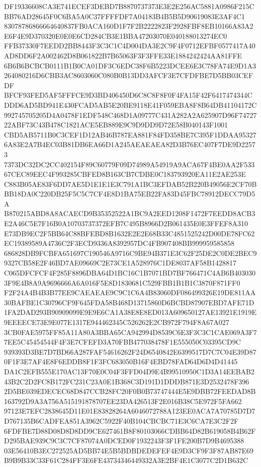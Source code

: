 \documentclass[UTF8,fontset=fandol,zihao=-4,a4paper]{ctexart}
\begin{document}
{{DF19336608CA3E741ECEF3DEBD7B8870737373E3E2E256AC5881A0986F215CBB76AD28645F0C6BA5A0C37FFFFDF7A04183B4B5B5D90619083E3AF4C1
83078786866664640837FB0ACA160D1F7F2B2222823F2928FBF8EB10166A83A2E6F4E9D370320E0E0E6CD284CB3E1BBA47203070E040188013274EC0
FFB37330F7EEDD2BB8443F3C3C1C4D004DA3E2C9F4F0712EFBF0577417A40AD8DD6F2A002462D8B061822B7B65063F3F3FFE33E1884242424AA81FFE
6B6B6BCBCB0111B1B0CA01DF3C6EDC38F6B5223DCEE6E3C78FA74E9D1A3264080216D6CBB3AC8603060C080B0B13DD3AFCF3E7CFDFBE7D5BB03CEFDF
BFCF93FED5AF5FFFCE9D3BD406450D6C8C8F8F0F4FA15F42F6417474344CDDD6AD5BD941E430FCAD5AB5E20BE9118E41F059EBA8F8B64DB41104172C
992745705205D4A0478F1EDF548C468D1A09777C431A282A2A625907D96F7472722ABF73C43B478C1821ACE5EB889E9C9D9DD9D72E58B040143F1001
CBD5AB5711B0C3CEF1D12AB46B787EA881F84FD358BE7C395F1DDAA953276A83E2A7B4EC03B81DB6EA66D1A245AEAEAEA82D3B76EC407F7DE9D22573
7373DC32DC2CC402154F89C60779F09D74989A54919A9ACA67F4BE0AA2F53367CEC89EEC4F993285CBFED8B163CB7CDBE0C183793920EA11E2AE253E
C883B05AE83F6DD7AE5D1E1E1E3C791A1BC3EFDAB52B220B49056E2CF70BBB18DA0C220DB25F5C5C7CF4E8D1BA75EB22FA83D45FBC78912DECC79D5A
B870215ABD8A8ACAECD9B35352522A1BC9A2EED1208F1472F7EEDD8ACB3E2A46C5E7F16B0A10703737372EFB7C495B8966D2B061435E0E3FFEF8A310
E73DB9EC2F5BB64C88BFEBD8B1632E2E2E68B33C4851525242D00DE78FC62EC19389589A4736C2F3ECD9336A8392957DC4FB907408BB999959585858
686828DB9FCBFA651697C190546A9716C9BE94B371E3C62F25DE2C0DE2BEC99327CB58E2F46BD7AE09669C2E73CE1A528976C1DE8037AF58B1428817
C065DFCFCF4F285F8896DBA64D1BC16C1B7071BD7BF766471C4AB6B4030303F9E4B8A9A9696666A6A016F5E8D1830681C529FBB1B1B1C3870F871FF0
F2F24A4B4B3B77EE9CAEAEAE9C9C1C6A4B83060DF086499326E19DE811AA30BAFBE1C30796CF9F645FDA58B468D13715860D6BCBD87907EBD7AFE71D
1FA2DAD293B90909099E9E9E6CA1A38E8E8ED013A609650127AE13921E1919E9EEEECE73E9E077E1317E944462345C526262E2CB972F794F8A67A027
3CB0FAE5975FF85A11A80A3BBA65CA942994D8539C6E3F3C3C1CAE069A3F77EE5C45454544F4F3E7CFEFD3A70FBB477038478F1E555050C03395CD9C
939393D3BE7D7BD66A287FAF54616262F24D6540842E6399517D7C7C04E39D870F1F3E7AF4E8F6EDDB8F1F3FC683050B16F4EBD78FAD64D6D4D41445
DA1C2EFB555E170AC13F70E0C04F3FFD04D9E4B99510950C1D3A14EEBAB243B2C2D2FC8B172FC231C23A0E1B368C3D191D1DDDB871E3D2532478F396
2D5BE039EDECEC68D847CCB28FC20F0B0B73747444E5E9DBB72FEEDAD8B163792D9A3A756A515191878707EE23DA426513F2E016B38C5E972F5FA662
97123E7EFC2838645D11E01E83828264A6046072788A123EE0ACA7A70785D7D7D767135B6CADFEA851A3962C5922F40B104CBCBC71E3C6CA7E3C2F2F
6FDFBE7D88D08D8D8DD9CE627461B8F80103066CDBB64D82B619058B4B62FD295BAE939C9C3C7CF87074A0DCED0F1932243F3F1FE200B7D9B4695388
03E56410B3EC272525AD5BB74E5B5BDBDEDEFEF4E9D3CF9F3F87AB87E69B9B9B33C33F61C284FF3E6FE43734346449332A3E2BF4E1C3077C2D1B632C
}}
\end{document}
